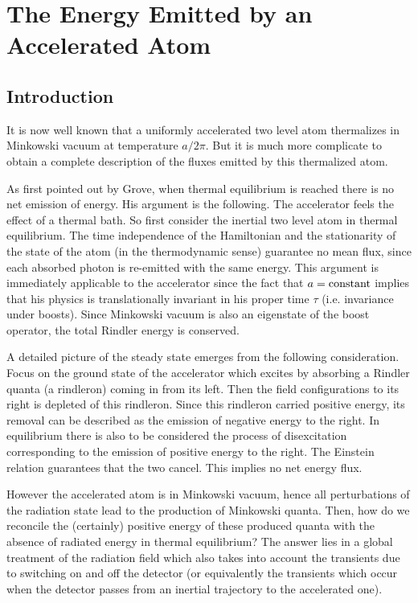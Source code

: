 \documentclass[12pt]{article}
\begin{document}
\section{The Energy Emitted by an Accelerated Atom}\label{EnAt}

\subsection{Introduction}\label{Intro2}

It is now well known that a uniformly accelerated two level atom
thermalizes in Minkowski vacuum at temperature $a/2 \pi$\cite{Unruh}.
But it is much more complicate to obtain a complete description
of the fluxes emitted by this thermalized atom.

As first pointed out by Grove\cite{Grove}, when thermal equilibrium is
reached there is no net  emission of energy.
His argument is the following. The accelerator feels the
effect
of a thermal bath.
So first consider the inertial two level atom in thermal equilibrium. The
time independence of the Hamiltonian and the
stationarity of the
state of the atom (in the thermodynamic sense) guarantee no mean flux,
since each
absorbed photon is re-emitted  with the
same energy.
This argument is immediately applicable to the accelerator since the
fact that $a={\rm constant}$ implies that his physics is translationally
invariant in his proper time $\tau $
(i.e. invariance under boosts). Since Minkowski
vacuum is
also an eigenstate of the boost operator, the total
Rindler energy is conserved.

A detailed picture of the steady state emerges from the following
consideration. Focus on the ground state of the accelerator which excites
by absorbing a Rindler quanta (a rindleron) coming in from its left. Then the
field
configurations  to its right is depleted of this rindleron. Since this
rindleron carried positive energy, its removal  can be described as the
emission of  negative energy to the right. In equilibrium there is also to be
considered the process of disexcitation corresponding to the emission of
positive energy   to the right. The Einstein relation
guarantees that the two cancel.
This implies no net energy flux.

However the accelerated atom is
in Minkowski vacuum, hence all perturbations of the radiation state
lead
to
the
production of Minkowski quanta.
Then, how do we reconcile the (certainly) positive energy of
these
produced quanta with the absence of radiated energy in thermal equilibrium?
The
answer
lies in a
global treatment of the radiation field which also takes into account the
transients due to switching on and off the detector (or equivalently
the transients which occur when the detector passes from an
inertial trajectory to the accelerated one).
\end{document}
